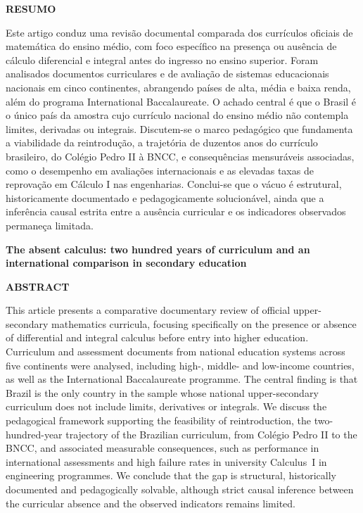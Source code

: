 \documentclass[12pt,a4paper,oneside]{article}
\begin{document}
\noindent\textbf{RESUMO}\\[2pt]
{\small\noindent
Este artigo conduz uma revisão documental comparada dos currículos
oficiais de matemática do ensino médio, com foco específico na presença
ou ausência de cálculo diferencial e integral antes do ingresso no
ensino superior. Foram analisados documentos curriculares e de avaliação
de sistemas educacionais nacionais em cinco continentes, abrangendo
países de alta, média e baixa renda, além do programa International
Baccalaureate. O achado central é que o Brasil é o único país da amostra
cujo currículo nacional do ensino médio não contempla limites, derivadas
ou integrais. Discutem-se o marco pedagógico que fundamenta a
viabilidade da reintrodução, a trajetória
de duzentos anos do currículo brasileiro, do Colégio Pedro II à BNCC, e
consequências mensuráveis associadas, como o desempenho em avaliações
internacionais e as elevadas taxas de reprovação em Cálculo I nas
engenharias. Conclui-se que o vácuo é estrutural, historicamente
documentado e pedagogicamente solucionável, ainda que a inferência
causal estrita entre a ausência curricular e os indicadores observados
permaneça limitada.\par}

\smallskip
{}

\medskip

\begin{center}
{\bfseries The absent calculus: two hundred years of curriculum and an
international comparison in secondary education}
\end{center}
\vspace{2pt}

\noindent\textbf{ABSTRACT}\\[2pt]
{\small\noindent
This article presents a comparative documentary review of official
upper-secondary mathematics curricula, focusing specifically on the
presence or absence of differential and integral calculus before
entry into higher education. Curriculum and assessment documents from
national education systems across five continents were analysed,
including high-, middle- and low-income countries, as well as the
International Baccalaureate programme. The central finding is that
Brazil is the only country in the sample whose national upper-secondary
curriculum does not include limits, derivatives or integrals. We discuss
the pedagogical framework supporting the feasibility of reintroduction,
the two-hundred-year trajectory of the
Brazilian curriculum, from Colégio Pedro II to the BNCC, and associated
measurable consequences, such as performance in international assessments
and high failure rates in university Calculus~I in engineering programmes.
We conclude that the gap is structural, historically documented and
pedagogically solvable, although strict causal inference between the
curricular absence and the observed indicators remains limited.\par}
\end{document}
